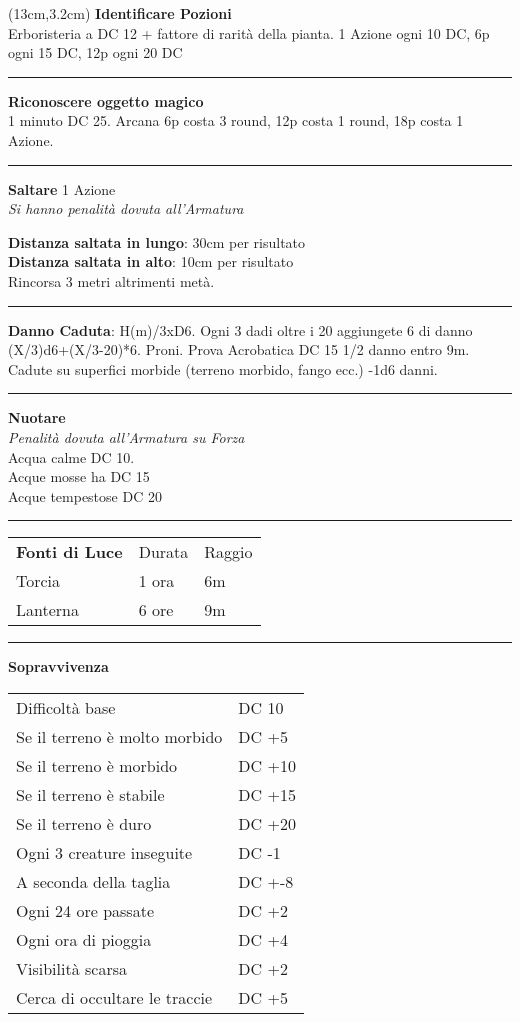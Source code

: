 \documentclass[a4paper,12 pt,openany]{book}
\newcommand{\riga}{\rule{\textwidth}{0.4pt}}
\begin{document}
\begin{textblock*}{7cm}(13cm,3.2cm) %
\textbf{Identificare  Pozioni}\\
Erboristeria a DC 12 + fattore di rarità della pianta.  1 Azione ogni 10 DC, 6p ogni 15 DC, 12p ogni 20 DC

\riga

\textbf{Riconoscere oggetto magico}\\
1 minuto DC 25. Arcana 6p costa 3 round, 12p costa 1 round, 18p costa 1 Azione.

\riga

\textbf{Saltare} 1 Azione\\
\textit{Si hanno penalità dovuta all'Armatura}

\textbf{Distanza saltata in lungo}: 30cm per risultato\\

\textbf{Distanza saltata in alto}: 10cm per risultato\\

Rincorsa 3 metri altrimenti metà.

\riga

\textbf{Danno Caduta}: H(m)/3xD6. Ogni 3 dadi oltre i 20 aggiungete 6 di danno (X/3)d6+(X/3-20)*6. Proni. Prova Acrobatica DC 15 1/2 danno entro 9m.  Cadute su superfici morbide (terreno morbido, fango ecc.) -1d6 danni.

\riga

\textbf{Nuotare}\\
\textit{Penalità dovuta all'Armatura su Forza}\\
Acqua calme DC 10.\\
Acque mosse ha DC 15\\
Acque tempestose DC 20

\riga

\begin{tabular}{lll}
\textbf{Fonti di Luce} & Durata&Raggio\\
Torcia& 1 ora & 6m\\
Lanterna & 6 ore & 9m\\
\end{tabular}

\riga


\textbf{Sopravvivenza}
\begin{tabular}{ll}
Difficoltà base  & DC 10\\
Se il terreno è molto morbido& DC +5\\
Se il terreno è morbido& DC +10\\
Se il terreno è stabile& DC +15\\
Se il terreno è duro& DC +20\\
Ogni 3 creature inseguite& DC -1\\
A seconda della taglia& DC +-8\\
Ogni 24 ore passate&DC +2\\
Ogni ora di pioggia&DC +4\\
Visibilità scarsa&DC +2\\
Cerca di occultare le traccie&DC +5\\
\end{tabular}\\


\end{textblock*}
\end{document}
